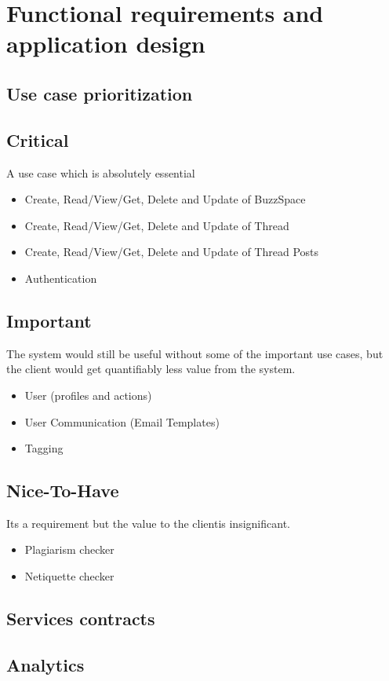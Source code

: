 \documentclass [a4paper,12pt] {article}
\begin{document}
\section{Functional requirements and application design}
	\subsection{Use case prioritization}
	\subsection*{Critical}A use case which is absolutely essential
	\begin{itemize}
		\item Create, Read/View/Get, Delete and Update of BuzzSpace
		\item Create, Read/View/Get, Delete and Update of Thread
		\item Create, Read/View/Get, Delete and Update of Thread Posts
		\item Authentication	
	\end{itemize}
	\subsection*{Important}The system would still be useful without some of the important use cases, but the client would get quantifiably less value from the system.
		\begin{itemize}
			\item User (profiles and actions)
			\item User Communication (Email Templates)
			\item Tagging
		\end{itemize}
	\subsection*{Nice-To-Have}Its a requirement but the value to the clientis insignificant.
		\begin{itemize}
			\item Plagiarism checker
			\item Netiquette checker
		\end{itemize}

\pagebreak
	\subsection{Services contracts}
		\subsection*{Analytics}
\end{document}
